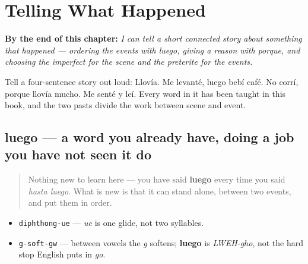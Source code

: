 
\chapter{Telling What Happened}
\label{ch:spanish-narrating}

\begin{chapteropening}
\textbf{By the end of this chapter:} \emph{I can tell a short connected story about something that happened — ordering the events with luego, giving a reason with porque, and choosing the imperfect for the scene and the preterite for the events.}

Tell a four-sentence story out loud: Llovía. Me levanté, luego bebí café. No corrí, porque llovía mucho. Me senté y leí. Every word in it has been taught in this book, and the two pasts divide the work between scene and event.
\end{chapteropening}

\section[luego]{luego — a word you already have, doing a job you have not seen it do}

\label{lesson:ES-C38-luego}



\begin{quote}
Nothing new to learn here — you have said \textbf{luego} every time you said \emph{hasta luego}. What is new is that it can stand alone, between two events, and put them in order.
\end{quote}

\begin{sounds}
\begin{itemize}
\raggedright
  \item \texttt{diphthong-ue} — \emph{ue} is one glide, not two syllables.
  \item \texttt{g-soft-gw} — between vowels the \emph{g} softens; \textbf{luego} is \emph{LWEH-gho}, not the hard stop English puts in \emph{go}.
\end{itemize}
\end{sounds}

